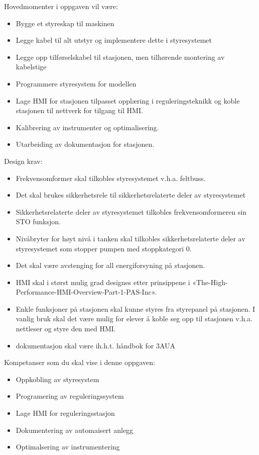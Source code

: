 \vskip 5pt 
 Hovedmomenter i oppgaven vil være: 
\begin{itemize}[noitemsep]
	\item Bygge et styreskap til maskinen
	\item Legge kabel til alt utstyr og implementere dette i styresystemet
	\item Legge opp tilførselskabel til stasjonen, men tilhørende montering av kabelstige 
	\item Programmere styresystem for modellen 
	\item Lage HMI for stasjonen tilpasset opplæring i reguleringsteknikk og koble stasjonen til  nettverk for tilgang til HMI.  
	\item Kalibrering av instrumenter og optimalisering. 
	\item Utarbeiding av dokumentasjon for stasjonen. 
\end{itemize}



 

Design krav:  
\begin{itemize}[noitemsep]
	\item Frekvensomformer skal tilkobles styresystemet v.h.a. feltbuss. 
	\item Det skal brukes sikkerhetsrele til sikkerhetsrelaterte deler av styresystemet
	\item Sikkerhetsrelaterte deler av styresystemet tilkobles frekvensomformeren sin STO funksjon.  
	\item Nivåbryter for høyt nivå i tanken skal tilkobles sikkerhetsrelaterte deler av styresystemet som stopper pumpen med stoppkategori 0.
	\item Det skal være avstenging for all energiforsyning på stasjonen.  
	\item HMI skal i størst mulig grad designes etter prinsippene i «The-High-Performance-HMI-Overview-Part-1-PAS-Inc».  
	\item Enkle funksjoner på stasjonen skal kunne styres fra styrepanel på stasjonen. I vanlig bruk skal det være mulig for elever å koble seg opp til stasjonen v.h.a. nettleser og styre den med HMI.  
	\item dokumentasjon skal være ih.h.t. håndbok for 3AUA
\end{itemize}

\vskip 5pt 
Kompetanser som du skal vise i denne oppgaven:
\begin{itemize}[noitemsep]
	\item Oppkobling av styresystem
	\item Programering av reguleringssystem
	\item Lage HMI for reguleringsstasjon
	\item Dokumentering av automaisert anlegg
	\item Optimalsering av instrumentering
\end{itemize}




